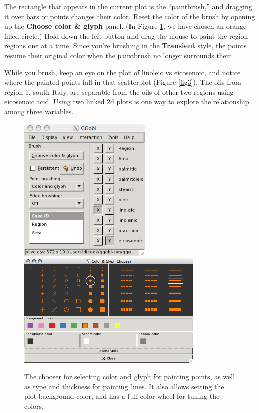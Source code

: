 \documentclass[11pt]{article}
\def\Widget#1{\textbf{#1}}
\begin{document}
The rectangle that appears in the current plot is the ``paintbrush,''
and dragging it over bars or points changes their color.  Reset the
color of the brush by opening up the \Widget{Choose color \& glyph}
panel. (In Figure \ref{fig2}, we have chosen an orange filled circle.)
Hold down the left button and drag the mouse to paint the region
regions one at a time.  Since you're brushing in the
\Widget{Transient} style, the points resume their original color when
the paintbrush no longer surrounds them.

While you brush, keep an eye on the plot of linoleic vs eicosenoic,
and notice where the painted points fall in that scatterplot (Figure
\ref{fig3}).  The oils from region 1, south Italy, are separable from
the oils of other two regions using eicosenoic acid. Using two linked
2d plots is one way to explore the relationship among three variables.

\begin{figure}[htp]
\begin{center}
\includegraphics[width=2.5in]{Figures/olive-brushpanel.png}\hspace{0.2in}\includegraphics[width=3.5in]{Figures/olive-colorchoose.png}
\end{center}
\caption{The chooser for selecting color and glyph for painting points,
as well as type and thickness for painting lines. It also allows setting
the plot background color, and has a full color wheel for tuning the
colors.
}
\label{fig2}
\end{figure}
\end{document}
